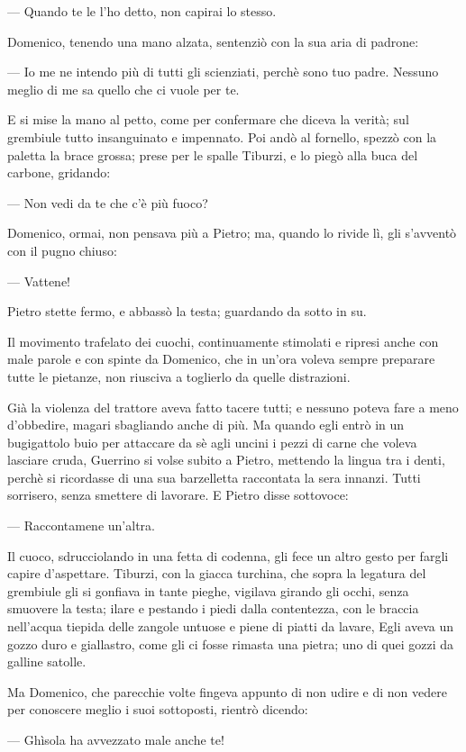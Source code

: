 — Quando te le l'ho detto, non capirai lo stesso.

Domenico, tenendo una mano alzata, sentenziò con la sua aria di padrone:

— Io me ne intendo più di tutti gli scienziati, perchè sono tuo padre. Nessuno meglio di me sa quello che ci vuole per te.

E si mise la mano al petto, come per confermare che diceva la verità; sul grembiule tutto insanguinato e impennato. Poi andò al fornello, spezzò con la paletta la brace grossa; prese per le spalle Tiburzi, e lo piegò alla buca del carbone, gridando:

— Non vedi da te che c'è più fuoco?

Domenico, ormai, non pensava più a Pietro; ma, quando lo rivide lì, gli s'avventò con il pugno chiuso:

— Vattene!

Pietro stette fermo, e abbassò la testa; guardando da sotto in su.

Il movimento trafelato dei cuochi, continuamente stimolati e ripresi anche con male parole e con spinte da Domenico, che in un'ora voleva sempre preparare tutte le pietanze, non riusciva a toglierlo da quelle distrazioni.

Già la violenza del trattore aveva fatto tacere tutti; e nessuno poteva fare a meno d'obbedire, magari sbagliando anche di più. Ma quando egli entrò in un bugigattolo buio per attaccare da sè agli uncini i pezzi di carne che voleva lasciare cruda, Guerrino si volse subito a Pietro, mettendo la lingua tra i denti, perchè si ricordasse di una sua barzelletta raccontata la sera innanzi. Tutti sorrisero, senza smettere di lavorare. E Pietro disse sottovoce:

— Raccontamene un'altra.

Il cuoco, sdrucciolando in una fetta di codenna, gli fece un altro gesto per fargli capire d'aspettare. Tiburzi, con la giacca turchina, che sopra la legatura del grembiule gli si gonfiava in tante pieghe, vigilava girando gli occhi, senza smuovere la testa; ilare e pestando i piedi dalla contentezza, con le braccia nell'acqua tiepida delle zangole untuose e piene di piatti da lavare, Egli aveva un gozzo duro e giallastro, come gli ci fosse rimasta una pietra; uno di quei gozzi da galline satolle.

Ma Domenico, che parecchie volte fingeva appunto di non udire e di non vedere per conoscere meglio i suoi sottoposti, rientrò dicendo:

— Ghìsola ha avvezzato male anche te!

